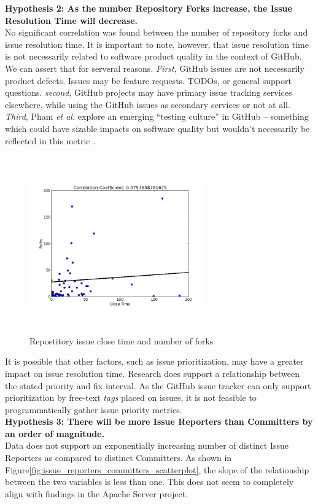 \documentclass{proc}
\begin{document}
{{{{{{\noindent \textbf{Hypothesis 2: As the number Repository Forks increase, the Issue Resolution Time will decrease.}\\
No significant correlation was found between the number of repository forks and issue resolution time. It is important to note, however, that issue resolution time is not necessarily related to software product quality in the context of GitHub. We can assert that for serveral reasons. \textit{First}, GitHub issues are not necessarily product defects. Issues may be feature requests. TODOs, or general support questions. \textit{second}, GitHub projects may have primary issue tracking services elsewhere, while using the GitHub issues as secondary services or not at all. \textit{Third}, Pham \textit{et al.} explore an emerging ``testing culture'' in GitHub -- something which could have sizable impacts on software quality but wouldn't necessarily be reflected in this metric \cite{phamcreating}.

\begin{figure}
\includegraphics[height=3in,width=3in]{images/issue_close_time_forks_scatterplot.png}
\caption{Repostitory issue close time and number of forks}
\label{fig:issue_close_time_forks_scatterplot}
\end{figure}

It is possible that other factors, such as issue prioritization, may have a greater impact on issue resolution time. Research does support a relationship\cite{mockus2002two} between the stated priority and fix interval. As the GitHub issue tracker can only support prioritization by free-text \textit{tags} placed on issues, it is not feasible to programmatically gather issue priority metrics.\\

\noindent \textbf{Hypothesis 3: There will be more Issue Reporters than Committers by an order of magnitude.}\\
Data does not support an exponentially increasing number of distinct Issue Reporters as compared to distinct Committers. 
As shown in Figure\ref{fig:issue_reporters_committers_scatterplot}, the slope of the relationship between the two variables is less than one. This does not seem to completely align with findings in the Apache Server project\cite{mockus2000case}. 

}}}}}}
\end{document}
